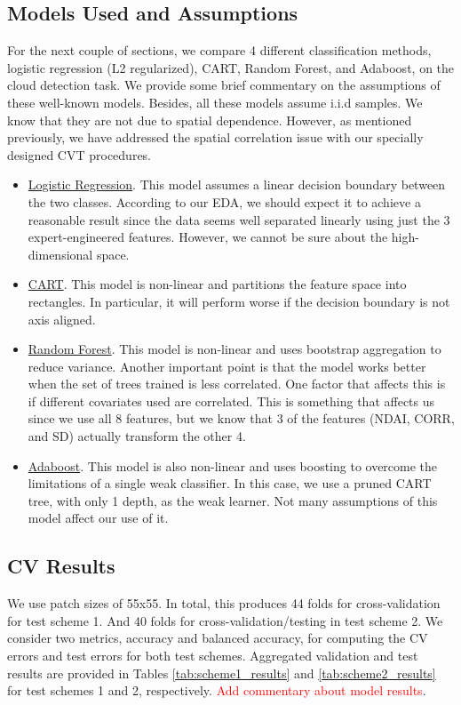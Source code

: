 \documentclass[11pt, letterpaper, journal]{IEEEtran}
\begin{document}
\subsection{Models Used and Assumptions}
For the next couple of sections, we compare 4 different classification methods, logistic regression (L2 regularized), CART, Random Forest, and Adaboost, on the cloud detection task. We provide some brief commentary on the assumptions of these well-known models. Besides, all these models assume i.i.d samples. We know that they are not due to spatial dependence. However, as mentioned previously, we have addressed the spatial correlation issue with our specially designed CVT procedures. 
\begin{itemize}
    \item \underline{Logistic Regression}. This model assumes a linear decision boundary between the two classes. According to our EDA, we should expect it to achieve a reasonable result since the data seems well separated linearly using just the 3 expert-engineered features. However, we cannot be sure about the high-dimensional space.
    \item \underline{CART}. This model is non-linear and partitions the feature space into rectangles. In particular, it will perform worse if the decision boundary is not axis aligned. 
    \item \underline{Random Forest}. This model is non-linear and uses bootstrap aggregation to reduce variance. Another important point is that the model works better when the set of trees trained is less correlated. One factor that affects this is if different covariates used are correlated. This is something that affects us since we use all 8 features, but we know that 3 of the features (NDAI, CORR, and SD) actually transform the other 4.
    \item \underline{Adaboost}. This model is also non-linear and uses boosting to overcome the limitations of a single weak classifier. In this case, we use a pruned CART tree, with only 1 depth, as the weak learner. Not many assumptions of this model affect our use of it.
\end{itemize}


\subsection{CV Results}
We use patch sizes of 55x55. In total, this produces 44 folds for cross-validation for test scheme 1. And 40 folds for cross-validation/testing in test scheme 2. We consider two metrics, accuracy and balanced accuracy, for computing the CV errors and test errors for both test schemes. Aggregated validation and test results are provided in Tables \ref{tab:scheme1_results} and \ref{tab:scheme2_results} for test schemes 1 and 2, respectively. \textcolor{red}{Add commentary about model results}.
\end{document}
